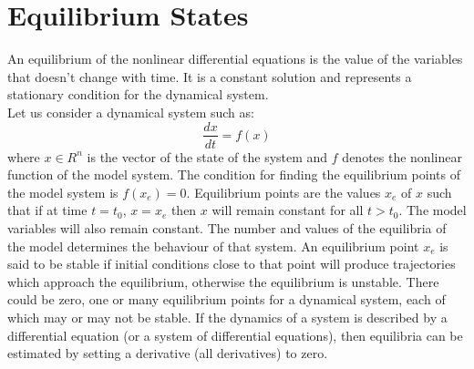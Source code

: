 \documentclass[12pt,a4wide]{report}
\numberwithin{equation}{chapter}
\numberwithin{theorem}{chapter}
\begin{document}
\section{Equilibrium States}
An equilibrium of the nonlinear differential equations is the value of the variables that doesn't change with time. It is a constant solution and represents a stationary condition for the dynamical system.\\
Let us consider a dynamical system such as:
\begin{equation}
\frac{dx}{dt}=f(x)
\end{equation}
where 
$x \in R^n$ is the vector of the state of the system and $f$ denotes the nonlinear function of the model system. The condition for finding the equilibrium points of the model system is $f(x_{e})=0$. Equilibrium points are the values $x_{e}$  of $x$ such that if at time $t =t_{0}$, $x=x_e$ then $x$ will remain constant for all $t > t_{0}$. The model variables will also remain constant. The number and values of the equilibria of the model determines the behaviour of that system. An equilibrium point $x_{e} $ is said to be stable if initial conditions close to that point will produce trajectories which approach the equilibrium, otherwise the equilibrium is unstable. There could be zero, one or many equilibrium points for a dynamical system, each of which may or may not be stable.
If the dynamics of a system is described by a differential equation (or a system of differential equations), then equilibria can be estimated by setting a derivative (all derivatives) to zero.
\end{document}
